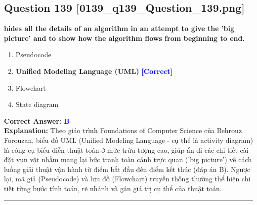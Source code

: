 \documentclass[11pt,a4paper]{article}
\begin{document}
\begin{minipage}{\textwidth}
\subsection*{Question 139 \quad \footnotesize{[0139\_q139\_Question\_139.png]}}
\noindent \textbf{hides all the details of an algorithm in an attempt to give the 'big picture' and to show how the algorithm flows from beginning to end.}

\begin{enumerate}[label=\Alph*.]
    \item Pseudocode
    \item \textbf{Unified Modeling Language (UML)} \hfill \textcolor{blue}{\textbf{[Correct]}}
    \item Flowchart
    \item State diagram
\end{enumerate}

\noindent \textbf{Correct Answer:} \textcolor{blue}{\textbf{B}} \\[2pt]
\noindent \textbf{Explanation:} Theo giáo trình Foundations of Computer Science của Behrouz Forouzan, biểu đồ UML (Unified Modeling Language - cụ thể là activity diagram) là công cụ biểu diễn thuật toán ở mức trừu tượng cao, giúp ẩn đi các chi tiết cài đặt vụn vặt nhằm mang lại bức tranh toàn cảnh trực quan ('big picture') về cách luồng giải thuật vận hành từ điểm bắt đầu đến điểm kết thúc (đáp án B). Ngược lại, mã giả (Pseudocode) và lưu đồ (Flowchart) truyền thống thường thể hiện chi tiết từng bước tính toán, rẽ nhánh và gán giá trị cụ thể của thuật toán.

\par\vspace{0.3cm}
\hrule
\vspace{0.3cm}
\end{minipage}
\end{document}
